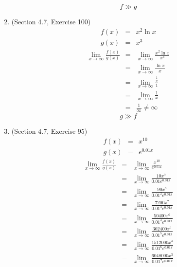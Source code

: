 \documentclass{article}
\begin{document}
\begin{enumerate}
        $$f \gg g$$
    \item (Section 4.7, Exercise 100)
        \begin{eqnarray}
            f(x) &=& x^2\ln{x} \\
            g(x) &=& x^3
        \end{eqnarray}
        \begin{eqnarray}
            \lim_{x \to \infty}{\frac{f(x)}{g(x)}} &=& \lim_{x \to \infty}{\frac{x^2\ln{x}}{x^3}} \\
                                                   &=& \lim_{x \to \infty}{\frac{\ln{x}}{x}} \\
                                                   &=& \lim_{x \to \infty}{\frac{\frac{1}{x}}{1}} \\
                                                   &=& \lim_{x \to \infty}{\frac{1}{x}} \\
                                                   &=& \frac{1}{\infty} \neq \infty
        \end{eqnarray}
        $$g \gg f$$
    \item (Section 4.7, Exercise 95)
        \begin{eqnarray}
            f(x) &=& x^{10} \\
            g(x) &=& e^{0.01x}
        \end{eqnarray}
        \begin{eqnarray}
            \lim_{x \to \infty}{\frac{f(x)}{g(x)}} &=& \lim_{x \to \infty}{\frac{x^{10}}{e^{0.01x}}} \\
                                                   &=& \lim_{x \to \infty}{\frac{10x^9}{0.01e^{0.01x}}} \\
                                                   &=& \lim_{x \to \infty}{\frac{90x^8}{0.01^2e^{0.01x}}} \\
                                                   &=& \lim_{x \to \infty}{\frac{7200x^7}{0.01^3e^{0.01x}}} \\
                                                   &=& \lim_{x \to \infty}{\frac{50400x^6}{0.01^4e^{0.01x}}} \\
                                                   &=& \lim_{x \to \infty}{\frac{302400x^5}{0.01^5e^{0.01x}}} \\
                                                   &=& \lim_{x \to \infty}{\frac{1512000x^4}{0.01^6e^{0.01x}}} \\
                                                   &=& \lim_{x \to \infty}{\frac{6048000x^3}{0.01^7e^{0.01x}}} \\

\end{eqnarray}
\end{enumerate}
\end{document}

